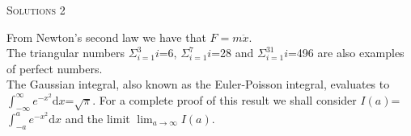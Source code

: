 \documentclass{article}
\newcommand{\newt}{$F = m \ddot{x}$}
\newcommand{\triang}[1]{$\Sigma_{i=1}^{#1} i$}
\newcommand{\gauss}[1][\infty]{$\int_{-#1}^{#1} e^{-x^2} \textrm{d}x$}
\begin{document}
\begin{center}
  \Large\color{black!80}\textsc{Solutions 2}
\end{center}

From Newton's second law we have that \newt.\\

The triangular numbers \triang{3}=6, \triang{7}=28 and
\triang{31}=496 are also examples of perfect numbers.\\

The Gaussian integral, also known as the Euler-Poisson
integral, evaluates to \gauss=$\sqrt{\pi}$. For a complete proof
of this result we shall consider $I(a)$=\gauss[a] and the limit
$\lim_{a\rightarrow\infty} I(a)$.
\end{document}
